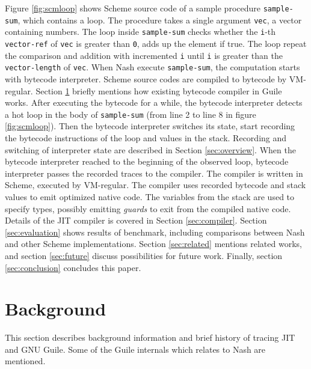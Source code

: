 \documentclass[preprint, numbers]{sigplanconf}
\begin{document}
Figure \hyperref[fig:scmloop]{\ref{fig:scmloop}} shows Scheme source code of a
sample procedure \texttt{sample-sum}, which contains a loop. The procedure
takes a single argument \texttt{vec}, a vector containing numbers. The loop
inside \texttt{sample-sum} checks whether the \texttt{i}-th
\texttt{vector-ref} of \texttt{vec} is greater than \texttt{0}, adds up the
element if true. The loop repeat the comparison and addition with incremented
\texttt{i} until \texttt{i} is greater than the \texttt{vector-length} of
\texttt{vec}.  When Nash execute \texttt{sample-sum}, the computation starts
with bytecode interpreter. Scheme source codes are compiled to bytecode by
VM-regular. Section \hyperref[sec:background]{\ref{sec:background}} briefly
mentions how existing bytecode compiler in Guile works. After executing the
bytecode for a while, the bytecode interpreter detects a hot loop in the body
of \texttt{sample-sum} (from line 2 to line 8 in figure
\hyperref[fig:scmloop]{\ref{fig:scmloop}}). Then the bytecode interpreter
switches its state, start recording the bytecode instructions of the loop and
values in the stack. Recording and switching of interpreter state are
described in Section \hyperref[sec:overview]{\ref{sec:overview}}. When the
bytecode interpreter reached to the beginning of the observed loop, bytecode
interpreter passes the recorded traces to the compiler. The compiler is
written in Scheme, executed by VM-regular. The compiler uses recorded bytecode
and stack values to emit optimized native code. The variables from the stack
are used to specify types, possibly emitting \textit{guards} to exit from
the compiled native code. Details of the JIT compiler is covered in Section
\hyperref[sec:compiler]{\ref{sec:compiler}}. Section
\hyperref[sec:evaluation]{\ref{sec:evaluation}} shows results of benchmark,
including comparisons between Nash and other Scheme implementations. Section
\hyperref[sec:related]{\ref{sec:related}} mentions related works, and section
\hyperref[sec:future]{\ref{sec:future}} discuss possibilities for future
work. Finally, section \hyperref[sec:conclusion]{\ref{sec:conclusion}}
concludes this paper.

\section{Background}
\label{sec:background}

This section describes background information and brief history of tracing JIT
and GNU Guile. Some of the Guile internals which relates to Nash are
mentioned.
\end{document}
